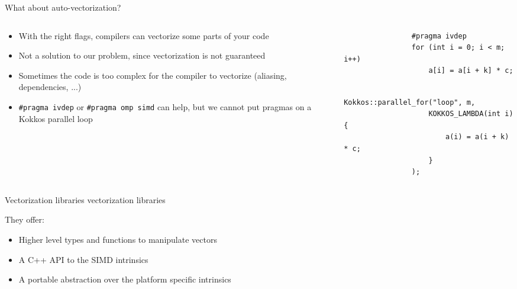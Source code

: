 \documentclass[
    aspectratio=169,
]{beamer}
\begin{document}
\begin{frame}[fragile]{What about auto-vectorization?}
    \begin{columns}
        \begin{column}{0.5\linewidth}
            \begin{itemize}
                \item With the right flags, compilers can vectorize some parts of your code
                \item Not a solution to our problem, since vectorization is not guaranteed
                \item Sometimes the code is too complex for the compiler to vectorize (aliasing, dependencies, ...)
                \item \texttt{\#pragma ivdep} or \texttt{\#pragma omp simd} can help, but we cannot put pragmas on a Kokkos parallel loop
            \end{itemize}
        \end{column}
        \begin{column}{0.5\linewidth}
            \begin{verbatim}
                #pragma ivdep
                for (int i = 0; i < m; i++)
                    a[i] = a[i + k] * c;
            \end{verbatim}
            \begin{verbatim}
                Kokkos::parallel_for("loop", m,
                    KOKKOS_LAMBDA(int i) {
                        a(i) = a(i + k) * c;
                    }
                );
            \end{verbatim}
        \end{column}
    \end{columns}
\end{frame}

\begin{frame}[fragile]{Vectorization libraries}
     vectorization libraries

    \vspace{10pt}

    They offer:
    \begin{itemize}
        \item Higher level types and functions to manipulate vectors
        \item A C++ API to the SIMD intrinsics
        \item A portable abstraction over the platform specific intrinsics
    \end{itemize}
\end{frame}
\end{document}
